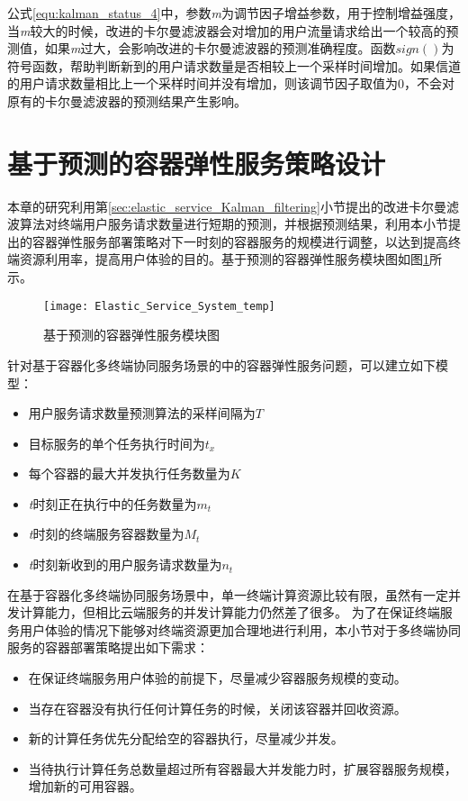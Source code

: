 公式\ref{equ:kalman_status_4}中，参数\emph{m}为调节因子增益参数，用于控制增益强度，当\emph{m}较大的时候，改进的卡尔曼滤波器会对增加的用户流量请求给出一个较高的预测值，如果\emph{m}过大，会影响改进的卡尔曼滤波器的预测准确程度。函数$sign()$为符号函数，帮助判断新到的用户请求数量是否相较上一个采样时间增加。如果信道的用户请求数量相比上一个采样时间并没有增加，则该调节因子取值为0，不会对原有的卡尔曼滤波器的预测结果产生影响。


\section{基于预测的容器弹性服务策略设计}\label{sec:elastic_service_strategy}

本章的研究利用第\ref{sec:elastic_service_Kalman_filtering}小节提出的改进卡尔曼滤波算法对终端用户服务请求数量进行短期的预测，并根据预测结果，利用本小节提出的容器弹性服务部署策略对下一时刻的容器服务的规模进行调整，以达到提高终端资源利用率，提高用户体验的目的。基于预测的容器弹性服务模块图如图\ref{fig:elastic_service_system}所示。

\begin{figure}[htbp]
    \centering
    \texttt{[image: Elastic\_Service\_System\_temp]}\hfill\\[0.5cm]
  \caption{基于预测的容器弹性服务模块图}
  \label{fig:elastic_service_system}
\end{figure}

针对基于容器化多终端协同服务场景的中的容器弹性服务问题，可以建立如下模型：
\begin{itemize}
    \item 用户服务请求数量预测算法的采样间隔为$T$
    \item 目标服务的单个任务执行时间为$t_x$
    \item 每个容器的最大并发执行任务数量为$K$
    \item \emph{t}时刻正在执行中的任务数量为$m_t$
    \item \emph{t}时刻的终端服务容器数量为$M_t$
    \item \emph{t}时刻新收到的用户服务请求数量为$n_t$
\end{itemize}

在基于容器化多终端协同服务场景中，单一终端计算资源比较有限，虽然有一定并发计算能力，但相比云端服务的并发计算能力仍然差了很多。
为了在保证终端服务用户体验的情况下能够对终端资源更加合理地进行利用，本小节对于多终端协同服务的容器部署策略提出如下需求：
\begin{itemize}
    \item 在保证终端服务用户体验的前提下，尽量减少容器服务规模的变动。
    \item 当存在容器没有执行任何计算任务的时候，关闭该容器并回收资源。
    \item 新的计算任务优先分配给空的容器执行，尽量减少并发。
    \item 当待执行计算任务总数量超过所有容器最大并发能力时，扩展容器服务规模，增加新的可用容器。
\end{itemize}

